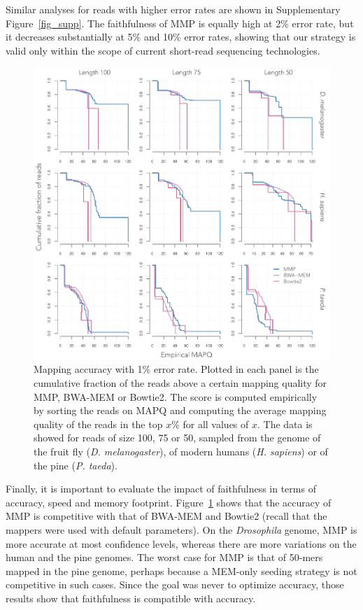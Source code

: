 \documentclass[a4,center,fleqn]{NAR}
\begin{document}
Similar analyses for reads with higher error rates are shown in
Supplementary Figure~\ref{fig_supp}. The faithfulness of MMP is equally
high at 2\% error rate, but it decreases substantially at 5\% and 10\%
error rates, showing that our strategy is valid only within the scope of
current short-read sequencing technologies.

\begin{figure}[t]
\begin{center}
\includegraphics[scale=.54]{fig_acc.pdf}
\end{center}
\caption{Mapping accuracy with 1\% error rate. Plotted in each panel is
the cumulative fraction of the reads above a certain mapping quality for
MMP, BWA-MEM or Bowtie2. The score is computed empirically by sorting the
reads on MAPQ and computing the average mapping quality of the reads in
the top $x$\% for all values of $x$. The data is showed for reads of size
100, 75 or 50, sampled from the genome of the fruit fly (\textit{D.
melanogaster}), of modern humans (\textit{H. sapiens}) or of the pine
(\textit{P. taeda}).}
\label{fig_acc}
\end{figure}

Finally, it is important to evaluate the impact of faithfulness in terms
of accuracy, speed and memory footprint. Figure~\ref{fig_acc} shows that
the accuracy of MMP is competitive with that of BWA-MEM and Bowtie2
(recall that the mappers were used with default parameters). On the
\textit{Drosophila} genome, MMP is more accurate at most confidence
levels, whereas there are more variations on the human and the pine
genomes. The worst case for MMP is that of 50-mers mapped in the pine
genome, perhaps because a MEM-only seeding strategy is not competitive in
such cases. Since the goal was never to optimize accuracy, those results
show that faithfulness is compatible with accuracy.
\end{document}
